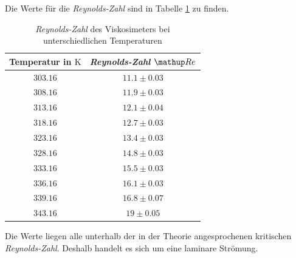 
Die Werte für die \emph{Reynolds-Zahl} sind in Tabelle \ref{tab:rey_visko} %
zu finden.

\begin{table}
\centering
\begin{tabular} {cc}
  \toprule
  Temperatur in $\si{\kelvin}$ & \emph{Reynolds-Zahl} $\map{Re}$ \\
  \midrule
  $\num{303.16}$ & $\num{11.1}\pm \num{0.03}$ \\
  $\num{308.16}$ & $\num{11.9}\pm \num{0.03}$ \\
  $\num{313.16}$ & $\num{12.1}\pm \num{0.04}$ \\
  $\num{318.16}$ & $\num{12.7}\pm \num{0.03}$ \\
  $\num{323.16}$ & $\num{13.4}\pm \num{0.03}$ \\
  $\num{328.16}$ & $\num{14.8}\pm \num{0.03}$ \\
  $\num{333.16}$ & $\num{15.5}\pm \num{0.03}$ \\
  $\num{336.16}$ & $\num{16.1}\pm \num{0.03}$ \\
  $\num{339.16}$ & $\num{16.8}\pm \num{0.07}$ \\
  $\num{343.16}$ & $\num{19}\pm \num{0.05}$ \\
\bottomrule
\end{tabular}
\caption{\emph{Reynolds-Zahl} des Viskosimeters bei unterschiedlichen Temperaturen} %
\label{tab:rey_visko}
\end{table}
Die Werte liegen alle unterhalb der in der Theorie angesprochenen kritischen \emph{Reynolds-Zahl}. %
Deshalb handelt es sich um eine laminare Strömung.
